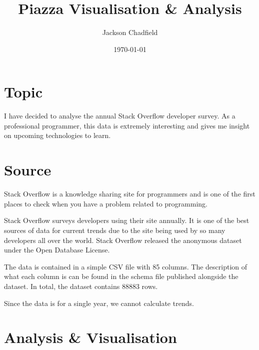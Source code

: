 \documentclass{scrartcl}
\title{Piazza Visualisation \& Analysis}
\author{Jackson Chadfield}
\date{\today}
\begin{document}
\maketitle

\section{Topic}
I have decided to analyse the annual Stack Overflow developer survey\cite{dataset}.
As a professional programmer, this data is extremely interesting and gives me insight on upcoming technologies to learn.

\section{Source}
Stack Overflow is a knowledge sharing site for programmers and is one of the first places to check when you have a problem related to programming.

Stack Overflow surveys developers using their site annually. It is one of the best sources of data for current trends due to the site being used by so many developers all over the world. Stack Overflow released the anonymous dataset under the Open Database License.

The data is contained in a simple CSV file with 85 columns. The description of what each column is can be found in the schema file published alongside the dataset. In total, the dataset contains \num{88883} rows.

Since the data is for a single year, we cannot calculate trends.

\section{Analysis \& Visualisation}
\end{document}
